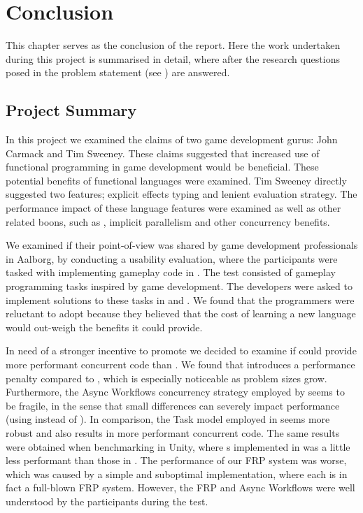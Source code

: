 \chapter{Conclusion}
This chapter serves as the conclusion of the report. Here the work undertaken during this project is summarised in detail, where after the research questions posed in the problem statement (see ) are answered.

\section{Project Summary}
In this project we examined the claims of two game development gurus: John Carmack and Tim Sweeney. These claims suggested that increased use of functional programming in game development would be beneficial. These potential benefits of functional languages were examined. Tim Sweeney directly suggested two features; explicit effects typing and lenient evaluation strategy. The performance impact of these language features were examined as well as other related boons, such as , implicit parallelism and other concurrency benefits.

We examined if their point-of-view was shared by game development professionals in Aalborg, by conducting a usability evaluation, where the participants were tasked with implementing gameplay code in \fs. The test consisted of gameplay programming tasks inspired by game development. The developers were asked to implement solutions to these tasks in \fs and \cs. We found that the programmers were reluctant to adopt \fs because they believed that the cost of learning a new language would out-weigh the benefits it could provide.

In need of a stronger incentive to promote \fs we decided to examine if \fs could provide more performant concurrent code than \cs. We found that \fs introduces a performance penalty compared to \cs, which is especially noticeable as problem sizes grow. Furthermore, the Async Workflows concurrency strategy employed by \fs seems to be fragile, in the sense that small differences can severely impact performance (using  instead of ). In comparison, the Task model employed in \cs seems more robust and also results in more performant concurrent code. The same results were obtained when benchmarking \fs in Unity, where s implemented in \fs was a little less performant than those in \cs. The performance of our \gls{FRP} system was worse, which was caused by a simple and suboptimal implementation, where each  is in fact a full-blown \gls{FRP} system. However, the \gls{FRP} and Async Workflows were well understood by the participants during the test.

